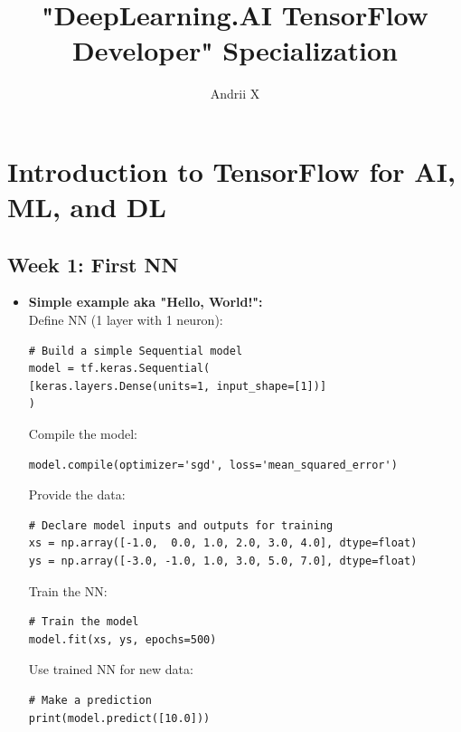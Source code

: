 \documentclass[20pt]{article}
\title{"DeepLearning.AI TensorFlow Developer" Specialization }
\author{ Andrii X }
\date{}
\begin{document}
	\maketitle
	
	\section{Introduction to TensorFlow for AI, ML, and DL}
	\subsection{Week 1: First NN}
	\begin{itemize}
		
		\item \textbf{Simple example aka "Hello, World!":}
		\\
		Define NN (1 layer with 1 neuron):
		\begin{verbatim}
# Build a simple Sequential model
model = tf.keras.Sequential(
[keras.layers.Dense(units=1, input_shape=[1])]
)
		\end{verbatim}
		Compile the model:
		\begin{verbatim}
model.compile(optimizer='sgd', loss='mean_squared_error')
		\end{verbatim}
		Provide the data:
		\begin{verbatim}
# Declare model inputs and outputs for training
xs = np.array([-1.0,  0.0, 1.0, 2.0, 3.0, 4.0], dtype=float)
ys = np.array([-3.0, -1.0, 1.0, 3.0, 5.0, 7.0], dtype=float)	
		\end{verbatim}
		Train the NN:
		\begin{verbatim}
# Train the model
model.fit(xs, ys, epochs=500)	
		\end{verbatim}
		Use trained NN for new data:
		\begin{verbatim}
# Make a prediction
print(model.predict([10.0]))	
		\end{verbatim}
	\end{itemize}
\end{document}
